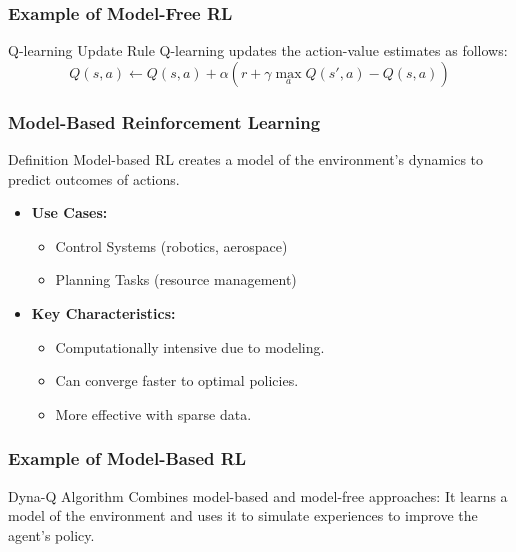 \documentclass[aspectratio=169]{beamer}
\begin{document}
\begin{frame}[fragile]
    \frametitle{Example of Model-Free RL}
    \begin{block}{Q-learning Update Rule}
        Q-learning updates the action-value estimates as follows:
        \begin{equation}
            Q(s, a) \leftarrow Q(s, a) + \alpha \left( r + \gamma \max_a Q(s', a) - Q(s, a) \right)
        \end{equation}
    \end{block}
\end{frame}

\begin{frame}[fragile]
    \frametitle{Model-Based Reinforcement Learning}
    \begin{block}{Definition}
        Model-based RL creates a model of the environment’s dynamics to predict outcomes of actions.
    \end{block}

    \begin{itemize}
        \item \textbf{Use Cases:}
        \begin{itemize}
            \item Control Systems (robotics, aerospace)
            \item Planning Tasks (resource management)
        \end{itemize}
        
        \item \textbf{Key Characteristics:}
        \begin{itemize}
            \item Computationally intensive due to modeling.
            \item Can converge faster to optimal policies.
            \item More effective with sparse data.
        \end{itemize}
    \end{itemize}
\end{frame}

\begin{frame}[fragile]
    \frametitle{Example of Model-Based RL}
    \begin{block}{Dyna-Q Algorithm}
        Combines model-based and model-free approaches:
        It learns a model of the environment and uses it to simulate experiences to improve the agent's policy.
    \end{block}
\end{frame}
\end{document}
